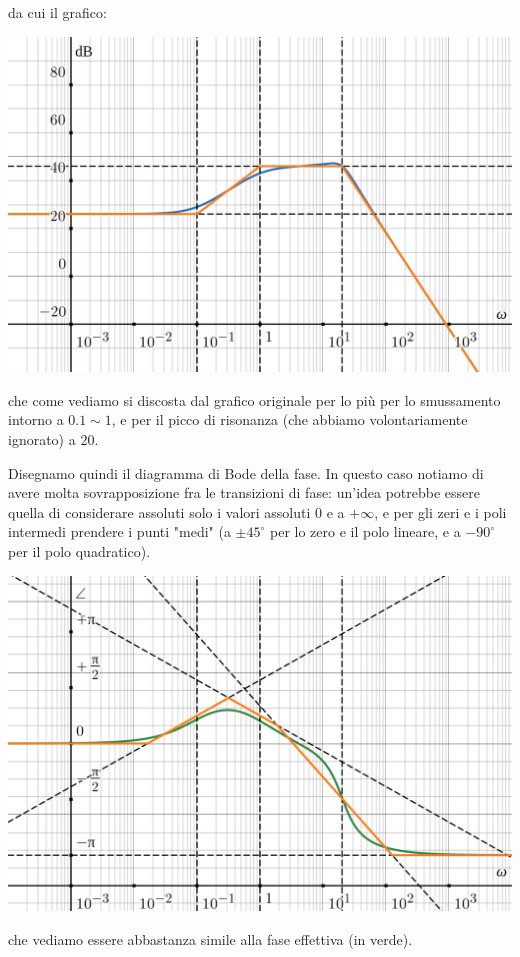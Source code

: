 \documentclass[a4paper,11pt]{article}
\begin{document}
\par\bigskip

\noindent
\begin{minipage}{\textwidth}
da cui il grafico:

\begin{center}
	\includegraphics[scale=0.3]{../figures/exerc_bode.png}
\end{center}
\end{minipage}

\par\bigskip

che come vediamo si discosta dal grafico originale per lo più per lo smussamento intorno a $0.1 \sim 1$, e per il picco di risonanza (che abbiamo volontariamente ignorato) a $20$.

\par\smallskip

Disegnamo quindi il diagramma di Bode della fase.
In questo caso notiamo di avere molta sovrapposizione fra le transizioni di fase: un'idea potrebbe essere quella di considerare assoluti solo i valori assoluti $0$ e a $+\infty$, e per gli zeri e i poli intermedi prendere i punti "medi" (a $\pm 45^\circ$ per lo zero e il polo lineare, e a $-90^\circ$ per il polo quadratico).

\par\bigskip

\noindent
\begin{minipage}{\textwidth}

\begin{center}
	\includegraphics[scale=0.3]{../figures/exerc_bode_phase.png}
\end{center}
\end{minipage}

\par\bigskip

che vediamo essere abbastanza simile alla fase effettiva (in verde).
\end{document}
